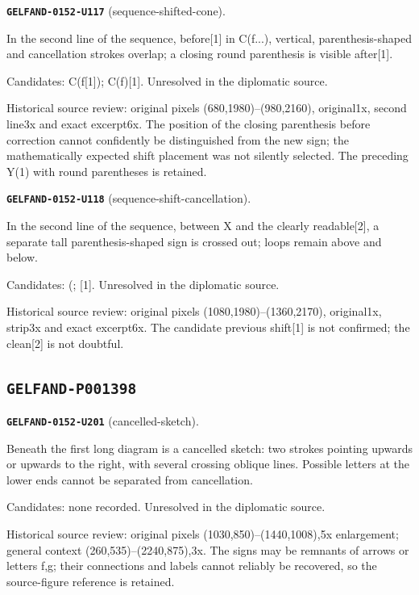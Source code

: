 \par\noindent\leavevmode{}\label{GELFAND-0152-U117}\textbf{\texttt{GELFAND-0152-U117}} (sequence-shifted-cone).\nopagebreak[4]\par
In the second line of the sequence, before[1] in C(f...), vertical, parenthesis-shaped and cancellation strokes overlap; a closing round parenthesis is visible after[1].\par
Candidates: C(f[1]); C(f)[1]. Unresolved in the diplomatic source.\par
Historical source review: original pixels (680,1980)–(980,2160), original1x, second line3x and exact excerpt6x. The position of the closing parenthesis before correction cannot confidently be distinguished from the new sign; the mathematically expected shift placement was not silently selected. The preceding Y(1) with round parentheses is retained.\par\medskip
\par\noindent\leavevmode{}\label{GELFAND-0152-U118}\textbf{\texttt{GELFAND-0152-U118}} (sequence-shift-cancellation).\nopagebreak[4]\par
In the second line of the sequence, between X and the clearly readable[2], a separate tall parenthesis-shaped sign is crossed out; loops remain above and below.\par
Candidates: (; [1]. Unresolved in the diplomatic source.\par
Historical source review: original pixels (1080,1980)–(1360,2170), original1x, strip3x and exact excerpt6x. The candidate previous shift[1] is not confirmed; the clean[2] is not doubtful.\par\medskip
\subsection*{\texttt{GELFAND-P001398}}
\par\noindent\leavevmode{}\label{GELFAND-0152-U201}\textbf{\texttt{GELFAND-0152-U201}} (cancelled-sketch).\nopagebreak[4]\par
Beneath the first long diagram is a cancelled sketch: two strokes pointing upwards or upwards to the right, with several crossing oblique lines. Possible letters at the lower ends cannot be separated from cancellation.\par
Candidates: none recorded. Unresolved in the diplomatic source.\par
Historical source review: original pixels (1030,850)–(1440,1008),5x enlargement; general context (260,535)–(2240,875),3x. The signs may be remnants of arrows or letters f,g; their connections and labels cannot reliably be recovered, so the source-figure reference is retained.\par\medskip
